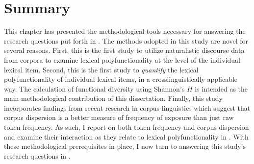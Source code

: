 \section{Summary}
\label{sec:3.5}

This chapter has presented the methodological tools necessary for answering the research questions put forth in . The methods adopted in this study are novel for several reasons. First, this is the first study to utilize naturalistic discourse data from corpora to examine lexical polyfunctionality at the level of the individual lexical item. Second, this is the first study to \emph{quantify} the lexical polyfunctionality of individual lexical items, in a crosslinguistically applicable way. The calculation of functional diversity using Shannon's $H$ is intended as the main methodological contribution of this dissertation. Finally, this study incorporates findings from recent research in corpus linguistics which suggest that corpus dispersion is a better measure of frequency of exposure than just raw token frequency. As such, I report on both token frequency and corpus dispersion and examine their interaction as they relate to lexical polyfunctionality in . With these methodological prerequisites in place, I now turn to answering this study's research questions in .
